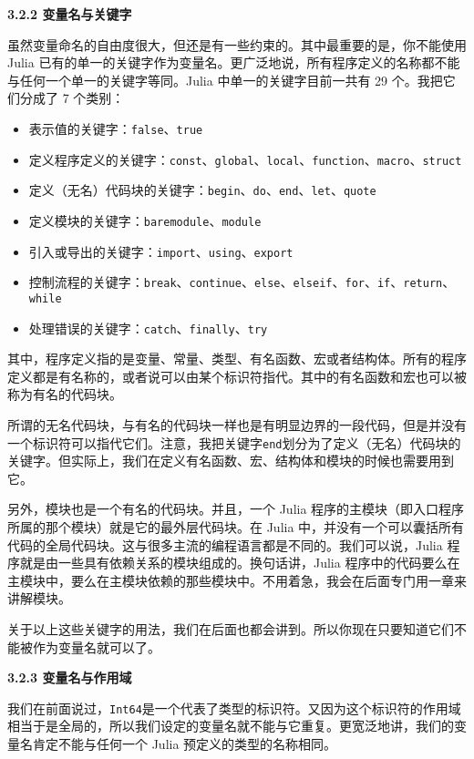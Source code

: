 \textbf{3.2.2 变量名与关键字}

虽然变量命名的自由度很大，但还是有一些约束的。其中最重要的是，你不能使用 Julia 已有的单一的关键字作为变量名。更广泛地说，所有程序定义的名称都不能与任何一个单一的关键字等同。Julia 中单一的关键字目前一共有 29 个。我把它们分成了 7 个类别：

\begin{itemize}
\item 表示值的关键字：\verb`false`、\verb`true`
\item 定义程序定义的关键字：\verb`const`、\verb`global`、\verb`local`、\verb`function`、\verb`macro`、\verb`struct`
\item 定义（无名）代码块的关键字：\verb`begin`、\verb`do`、\verb`end`、\verb`let`、\verb`quote`
\item 定义模块的关键字：\verb`baremodule`、\verb`module`
\item 引入或导出的关键字：\verb`import`、\verb`using`、\verb`export`
\item 控制流程的关键字：\verb`break`、\verb`continue`、\verb`else`、\verb`elseif`、\verb`for`、\verb`if`、\verb`return`、\verb`while`
\item 处理错误的关键字：\verb`catch`、\verb`finally`、\verb`try`
\end{itemize}

其中，程序定义指的是变量、常量、类型、有名函数、宏或者结构体。所有的程序定义都是有名称的，或者说可以由某个标识符指代。其中的有名函数和宏也可以被称为有名的代码块。

所谓的无名代码块，与有名的代码块一样也是有明显边界的一段代码，但是并没有一个标识符可以指代它们。注意，我把关键字\verb`end`划分为了定义（无名）代码块的关键字。但实际上，我们在定义有名函数、宏、结构体和模块的时候也需要用到它。

另外，模块也是一个有名的代码块。并且，一个 Julia 程序的主模块（即入口程序所属的那个模块）就是它的最外层代码块。在 Julia 中，并没有一个可以囊括所有代码的全局代码块。这与很多主流的编程语言都是不同的。我们可以说，Julia 程序就是由一些具有依赖关系的模块组成的。换句话讲，Julia 程序中的代码要么在主模块中，要么在主模块依赖的那些模块中。不用着急，我会在后面专门用一章来讲解模块。

关于以上这些关键字的用法，我们在后面也都会讲到。所以你现在只要知道它们不能被作为变量名就可以了。

\textbf{3.2.3 变量名与作用域}

我们在前面说过，\verb`Int64`是一个代表了类型的标识符。又因为这个标识符的作用域相当于是全局的，所以我们设定的变量名就不能与它重复。更宽泛地讲，我们的变量名肯定不能与任何一个 Julia 预定义的类型的名称相同。

